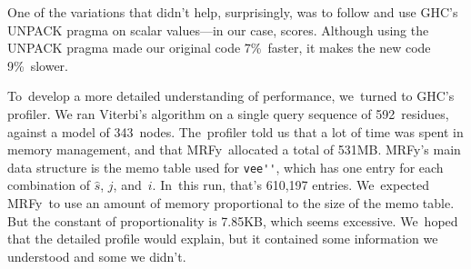 \documentclass[]{jfp1}
\newcommand\mrfy{MRFy} %
\begin{document}
One of the variations that didn't help, surprisingly, was
to follow
\citet{tibell:high-performance} and use GHC's UNPACK pragma on scalar
values---in our case, scores.
Although using the UNPACK pragma made our original code 7\%~faster, it
makes the new
code 9\%~slower.

To~develop a more detailed understanding of performance, we~turned
to GHC's profiler.
We ran Viterbi's algorithm on a single query sequence
of 592~residues, against a
model of 343~nodes.
The~profiler told us that a lot of time was spent in memory
management, and that \mrfy\ allocated a total of 531MB.
\mrfy's main data structure is the memo table used for \verb+vee''+, 
which has one entry for each combination of
$\hat s$, $j$, and~$i$.
In~this run, that's 610,197 entries.
We~expected \mrfy\ to use an amount of memory proportional to the
size of the memo table.
But the constant of proportionality is 7.85KB, which seems excessive.
We~hoped that the detailed profile would explain, but it
contained some information we
understood and some we didn't.
\end{document}

